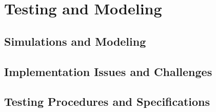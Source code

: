 \chapter{Testing and Modeling}

\blindtext

\section{Simulations and Modeling}

\Blindtext

\section{Implementation Issues and Challenges}

\Blindtext

\section{Testing Procedures and Specifications}

\Blindtext
